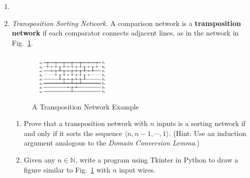 \documentclass[12pt,a4paper]{article}
\makeatletter
\newtheorem*{solution}{Solution}
\theoremstyle{definition}
\renewenvironment{solution}[1][Solution] {\par\pushQED{\qed}\normalfont\topsep6\p@\@plus6\p@\relax\trivlist\item[\hskip\labelsep\bfseries#1\@addpunct{.}]\ignorespaces}{\popQED\endtrivlist\@endpefalse} \makeatother
\makeatother
\begin{document}
\begin{enumerate}
\begin{solution}
\begin{enumerate}
\end{enumerate}
\end{solution}
\item
\textit{Transposition Sorting Network.} A comparison network is a \textbf{transposition network}  if each comparator connects adjacent lines, as in the network in Fig.~\ref{Fig-Transposition}.

\begin{figure}[htbp]
    \centering
    \includegraphics[width=0.4\textwidth]{Fig-Transposition.pdf}
    \caption{A Transposition Network Example}\label{Fig-Transposition}
\end{figure}

\begin{enumerate}
\item Prove that a transposition network with $n$ inputs is a sorting network if and only if it sorts the sequence $\langle n, n-1, \cdots, 1 \rangle$. {\color{blue}(Hint: Use an induction argument analogous to the \emph{Domain Conversion Lemma}.)}
\item {\color{red}{(Optional Sub-question with Bonus)}} Given any $n \in \mathbb{N}$, write a program using Tkinter in Python to draw a figure similar to Fig.~\ref{Fig-Transposition} with $n$ input wires.
\end{enumerate}
\end{enumerate}
\end{document}
